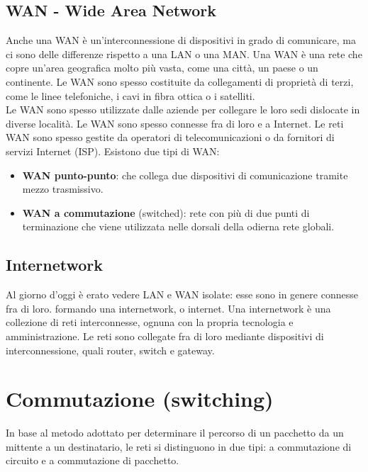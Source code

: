 \documentclass[12pt]{report}
\begin{document}
	\subsection{WAN - Wide Area Network}
	Anche una WAN è un'interconnessione di dispositivi in grado di comunicare, ma ci sono delle differenze rispetto a una LAN o una MAN. Una WAN è una rete che copre un'area geografica molto più vasta, come una città, un paese o un continente. Le WAN sono spesso costituite da collegamenti di proprietà di terzi, come le linee telefoniche, i cavi in fibra ottica o i satelliti. 
	\vspace{\baselineskip}\\
	Le WAN sono spesso utilizzate dalle aziende per collegare le loro sedi dislocate in diverse località. Le WAN sono spesso connesse fra di loro e a Internet. Le reti WAN sono spesso gestite da operatori di telecomunicazioni o da fornitori di servizi Internet (ISP). Esistono due tipi di WAN:
	\begin{itemize}
		\item \textbf{WAN punto-punto}: che collega due dispositivi di comunicazione tramite mezzo trasmissivo.
		\item \textbf{WAN a commutazione} (switched): rete con più di due punti di terminazione che viene utilizzata nelle dorsali della odierna rete globali.
	\end{itemize}

	\subsection{Internetwork}
	Al giorno d'oggi è erato vedere LAN e WAN isolate: esse sono in genere connesse fra di loro. formando una internetwork, o internet. Una internetwork è una collezione di reti interconnesse, ognuna con la propria tecnologia e amministrazione. Le reti sono collegate fra di loro mediante dispositivi di interconnessione, quali router, switch e gateway. 

	\section{Commutazione (switching)}
	In base al metodo adottato per determinare il percorso di un pacchetto da un mittente a un destinatario, le reti si distinguono in due tipi: a commutazione di circuito e a commutazione di pacchetto.
\end{document}
